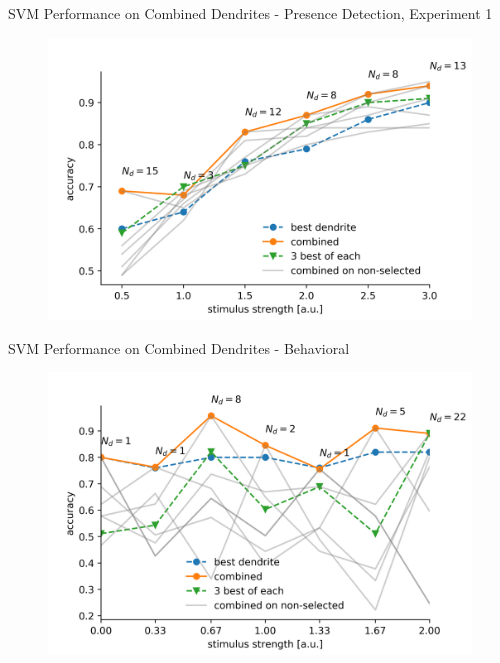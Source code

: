 \documentclass[10pt]{beamer}
\begin{document}
\begin{frame}[fragile]{SVM Performance on Combined Dendrites - Presence Detection, Experiment 1}
\begin{center}
	\begin{figure}
      \includegraphics[width=1.0\textwidth]{combined_presence_0.png}
	\end{figure}
	\end{center}
\end{frame}

\begin{frame}[fragile]{SVM Performance on Combined Dendrites - Behavioral}
\begin{center}
	\begin{figure}
      \includegraphics[width=1.0\textwidth]{combined_hitmiss.png}
	\end{figure}
	\end{center}
\end{frame}
\end{document}
